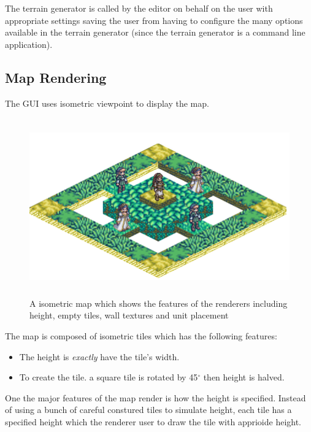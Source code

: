 The terrain generator is called by the editor on behalf on the user with appropriate settings saving the user from having to configure the many options available in the terrain generator (since the terrain generator is a command line application).


\subsection{Map Rendering}
\label{ssub:map_rendering}

The GUI uses isometric viewpoint to display the map. 

\begin{figure}[htbp]
	\centering
		\includegraphics[height=3in]{figures/imp-map.png}
	\caption{A isometric map which shows the features of the renderers including height, empty tiles, wall textures and unit placement}
	\label{fig:figures_imp-map}
\end{figure}

The map is composed of isometric tiles which has  the following features:

\begin{itemize}[topsep=0mm,noitemsep ]
	\item  The height is \emph{exactly} have the tile's width.
	\item  To create the tile. a square tile is rotated by 45$^{\circ}$ then height is halved.
\end{itemize}

One the major features of the map render is how the height is specified.  Instead of using a bunch of careful constured tiles to simulate height, each tile has a specified height which the renderer user to draw the tile with apprioide height. 

